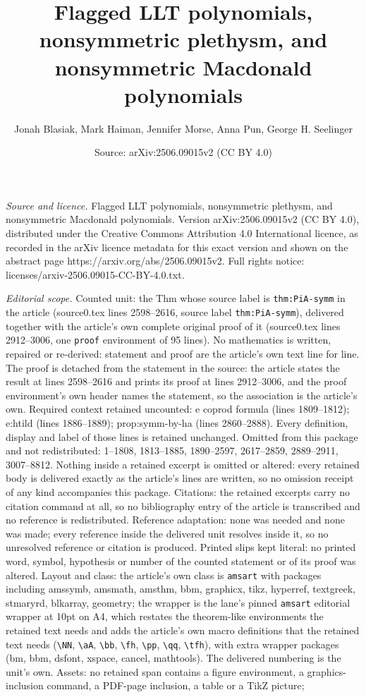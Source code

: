 \documentclass[10pt,a4paper]{amsart}
\title[Flagged LLT polynomials, nonsymmetric plethysm, and nonsymme]{Flagged LLT polynomials, nonsymmetric plethysm, and nonsymmetric Macdonald polynomials}
\author{Jonah Blasiak, Mark Haiman, Jennifer Morse, Anna Pun, George H. Seelinger}
\date{Source: arXiv:2506.09015v2 (CC BY 4.0)}
\begin{document}
\maketitle

\noindent\emph{Source and licence.} Flagged LLT polynomials, nonsymmetric plethysm, and nonsymmetric Macdonald polynomials. Version arXiv:2506.09015v2 (CC BY 4.0), distributed under the Creative Commons Attribution 4.0 International licence, as recorded in the arXiv licence metadata for this exact version and shown on the abstract page https://arxiv.org/abs/2506.09015v2. Full rights notice: licenses/arxiv-2506.09015-CC-BY-4.0.txt.\par\smallskip

\noindent\textit{Editorial scope.} Counted unit: the Thm whose source label is \texttt{thm:PiA-symm} in the article (source0.tex lines 2598--2616, source label \texttt{thm:PiA-symm}), delivered together with the article's own complete original proof of it (source0.tex lines 2912--3006, one \texttt{proof} environment of 95 lines). No mathematics is written, repaired or re-derived: statement and proof are the article's own text line for line. The proof is detached from the statement in the source: the article states the result at lines 2598--2616 and prints its proof at lines 2912--3006, and the proof environment's own header names the statement, so the association is the article's own. Required context retained uncounted: e coprod formula (lines 1809--1812); e:htild (lines 1886--1889); prop:symm-by-ha (lines 2860--2888). Every definition, display and label of those lines is retained unchanged. Omitted from this package and not redistributed: 1--1808, 1813--1885, 1890--2597, 2617--2859, 2889--2911, 3007--8812. Nothing inside a retained excerpt is omitted or altered: every retained body is delivered exactly as the article's lines are written, so no omission receipt of any kind accompanies this package. Citations: the retained excerpts carry no citation command at all, so no bibliography entry of the article is transcribed and no reference is redistributed. Reference adaptation: none was needed and none was made; every reference inside the delivered unit resolves inside it, so no unresolved reference or citation is produced. Printed slips kept literal: no printed word, symbol, hypothesis or number of the counted statement or of its proof was altered. Layout and class: the article's own class is \texttt{amsart} with packages including amssymb, amsmath, amsthm, bbm, graphicx, tikz, hyperref, textgreek, stmaryrd, blkarray, geometry; the wrapper is the lane's pinned \texttt{amsart} editorial wrapper at 10pt on A4, which restates the theorem-like environments the retained text needs and adds the article's own macro definitions that the retained text needs (\texttt{\textbackslash NN}, \texttt{\textbackslash aA}, \texttt{\textbackslash bb}, \texttt{\textbackslash fh}, \texttt{\textbackslash pp}, \texttt{\textbackslash qq}, \texttt{\textbackslash tfh}), with extra wrapper packages (bm, bbm, dsfont, xspace, cancel, mathtools). The delivered numbering is the unit's own. Assets: no retained span contains a figure environment, a graphics-inclusion command, a PDF-page inclusion, a table or a TikZ picture; 
\end{document}
